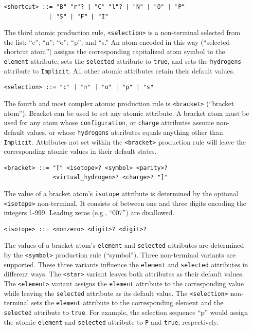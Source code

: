 \documentclass{article}
\def\ttt{\texttt}
\begin{document}
\begin{lstlisting}
<shortcut> ::= "B" "r"? | "C" "l"? | "N" | "O" | "P"
             | "S" | "F" | "I"
\end{lstlisting}

The third atomic production rule, \ttt{<selection>} is a non-terminal selected from the list: \enquote{c}; \enquote{n}; \enquote{o}; \enquote{p}; and \enquote{s.} An atom encoded in this way (\enquote{selected shortcut atom}) assigns the corresponding capitalized atom symbol to the \ttt{element} attribute, sets the \ttt{selected} attribute to \ttt{true}, and sets the \ttt{hydrogens} attribute to \ttt{Implicit}. All other atomic attributes retain their default values.

\begin{lstlisting}
<selection> ::= "c" | "n" | "o" | "p" | "s"
\end{lstlisting}

The fourth and most complex atomic production rule is \ttt{<bracket>} (\enquote{bracket atom}). Bracket can be used to set any atomic attribute. A bracket atom must be used for any atom whose \ttt{configuration}, or \ttt{charge} attributes assume non-default values, or whose \ttt{hydrogens} attributes equals anything other than \ttt{Implicit}. Attributes not set within the \ttt{<bracket>} production rule will leave the corresponding atomic values in their default states.

\begin{lstlisting}
<bracket> ::= "[" <isotope>? <symbol> <parity>?
              <virtual_hydrogen>? <charge>? "]"
\end{lstlisting}

The value of a bracket atom's \ttt{isotope} attribute is determined by the optional \ttt{<isotope>} non-terminal. It consists of between one and three digits encoding the integers 1-999. Leading zeros (e.g., \enquote{007}) are disallowed.

\begin{lstlisting}
<isotope> ::= <nonzero> <digit>? <digit>?
\end{lstlisting}

The values of a bracket atom's \ttt{element} and \ttt{selected} attributes are determined by the \ttt{<symbol>} production rule (\enquote{symbol}). Three non-terminal variants are supported. These three variants influence the \ttt{element} and \ttt{selected} attributes in different ways. The \ttt{<star>} variant leaves both attributes as their default values. The \ttt{<element>} variant assigns the \ttt{element} attribute to the corresponding value while leaving the \ttt{selected} attribute as its default value. The \ttt{<selection>} non-terminal sets the \ttt{element} attribute to the corresponding element and the \ttt{selected} attribute to \ttt{true}. For example, the selection sequence \enquote{p} would assign the atomic \ttt{element} and \ttt{selected} attribute to \ttt{P} and \ttt{true}, respectively.
\end{document}
